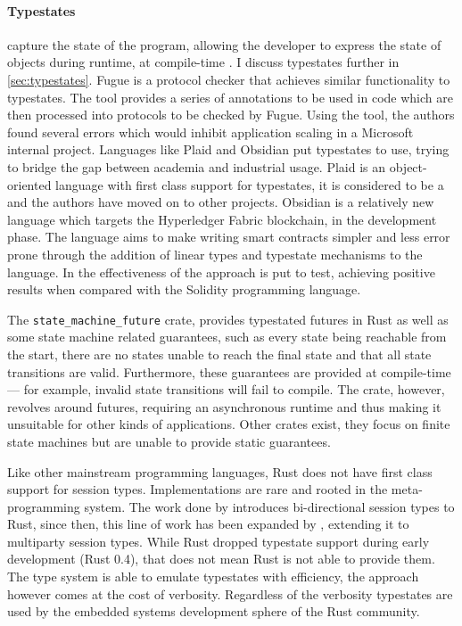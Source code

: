 \paragraph{Typestates} capture the state of the program,
allowing the developer to express the state of objects during runtime, at compile-time \autocite{Strom1983}.
I discuss typestates further in \autoref{sec:typestates}.
Fugue \autocite{DeLine2004} is a protocol checker that achieves similar functionality to typestates.
The tool provides a series of annotations to be used in code which are then processed into protocols to be checked by Fugue.
Using the tool, the authors found several errors which would inhibit application scaling in a Microsoft internal project.
Languages like Plaid \autocite{Aldrich2009} and Obsidian \autocite{Coblenz2020, Coblenz2020a} put typestates to use,
trying to bridge the gap between academia and industrial usage.
Plaid is an object-oriented language with first class support for typestates,
it is considered to be a  and the authors have moved on to other projects.
Obsidian is a relatively new language which targets the Hyperledger Fabric blockchain, in the development phase.
The language aims to make writing smart contracts simpler and less error prone
through the addition of linear types and typestate mechanisms to the language.
In \autocite{Coblenz2020} the effectiveness of the approach is put to test,
achieving positive results when compared with the Solidity programming language.

The \texttt{state\_machine\_future} crate, provides typestated futures in Rust as well as some state machine related guarantees,
such as every state being reachable from the start,
there are no states unable to reach the final state and that all state transitions are valid.
Furthermore, these guarantees are provided at compile-time --- for example, invalid state transitions will fail to compile.
The crate, however, revolves around futures, requiring an asynchronous runtime and thus making it unsuitable for other kinds of applications.
Other crates exist, they focus on finite state machines but are unable to provide static guarantees.

Like other mainstream programming languages, Rust does not have first class support for session types.
Implementations are rare and rooted in the meta-programming system.
The work done by \autocite{Jespersen2015} introduces bi-directional session types to Rust,
since then, this line of work has been expanded by \autocite{Lagaillardie2020}, extending it to multiparty session types.
While Rust dropped typestate support during early development (Rust 0.4), that does not mean Rust is not able to provide them.
The type system is able to emulate typestates with efficiency, the approach however comes at the cost of verbosity.
Regardless of the verbosity typestates are used by the embedded systems development sphere of the Rust community.

